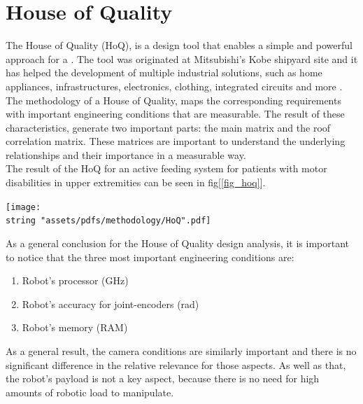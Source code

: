 \documentclass[11pt]{report} %
\begin{document}
\section{House of Quality}

The House of Quality (HoQ), is a design tool that enables a simple and powerful approach for a . The tool was originated at Mitsubishi’s Kobe shipyard site and it has helped the development of multiple industrial solutions, such as home appliances, infrastructures, electronics, clothing, integrated circuits and more \citep{cite_house_of_quality}.\\

The methodology of a House of Quality, maps the corresponding requirements with important engineering conditions that are measurable. The result of these characteristics, generate two important parts: the main matrix and the roof correlation matrix. These matrices are important to understand the underlying relationships and their importance in a measurable way.\\

The result of the HoQ for an active feeding system for patients with motor disabilities in upper extremities can be seen in fig[\ref{fig_hoq}].\\

\begin{center}
    \texttt{[image: \\string "assets/pdfs/methodology/HoQ".pdf]}
    \bigbreak
    \begin{minipage}{\linewidth} %
    \label{fig_hoq}
\end{minipage} \end{center}

As a general conclusion for the House of Quality design analysis, it is important to notice that the three most important engineering conditions are:\\

\begin{enumerate}
    \item Robot's processor (GHz)
    \item Robot's accuracy for joint-encoders (rad)
    \item Robot's memory (RAM)
\end{enumerate}

As a general result, the camera conditions are similarly important and there is no significant difference in the relative relevance for those aspects. As well as that, the robot's payload is not a key aspect, because there is no need for high amounts of robotic load to manipulate.\\
\end{document}
